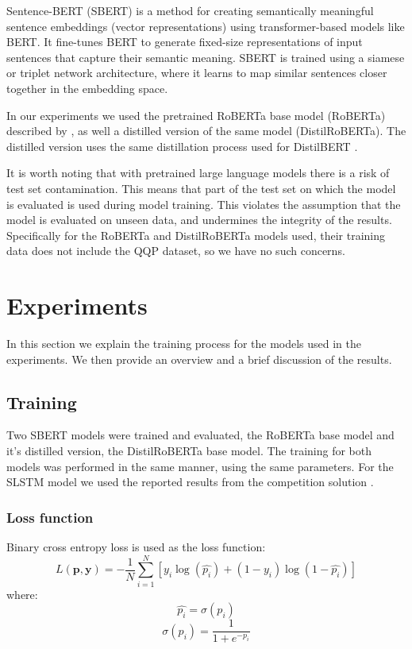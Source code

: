 \documentclass[10pt, a4paper]{article}
\begin{document}
Sentence-BERT (SBERT) is a method for creating semantically meaningful sentence embeddings (vector representations) using transformer-based models like BERT. It fine-tunes BERT to generate fixed-size representations of input sentences that capture their semantic meaning. SBERT is trained using a siamese or triplet network architecture, where it learns to map similar sentences closer together in the embedding space.

In our experiments we used the pretrained RoBERTa base model (RoBERTa) described by \citet{liu2019roberta}, as well a distilled version of the same model (DistilRoBERTa). The distilled version uses the same distillation process used for DistilBERT \cite{sanh2019distilbert}.

It is worth noting that with pretrained large language models there is a risk of test set contamination.
This means that part of the test set on which the model is evaluated is used during model training. This violates the assumption that the model is evaluated on unseen data, and undermines the integrity of the results.
Specifically for the RoBERTa and DistilRoBERTa models used, their training data does not include the QQP dataset, so we have no such concerns.

\section{Experiments}

In this section we explain the training process for the models used in the experiments.
We then provide an overview and a brief discussion of the results.

\subsection{Training} \label{training}

Two SBERT models were trained and evaluated, the RoBERTa base model and it's distilled version, the DistilRoBERTa base model.
The training for both models was performed in the same manner, using the same parameters.
For the SLSTM model we used the reported results from the competition solution \citep{dadashov2017quora}.

\subsubsection{Loss function}

Binary cross entropy loss is used as the loss function:
$$
L(\mathbf{p}, \mathbf{y}) = -\frac{1}{N} \sum_{i=1}^{N} \left[ y_i \log \left( \hat{p_i} \right) + (1 - y_i) \log \left( 1 - \hat{p_i} \right) \right]
$$
where:
$$
\hat{p_i} = \sigma(p_i)
$$
$$
\sigma(p_i) = \frac{1}{1 + e^{-p_i}}
$$
\end{document}
